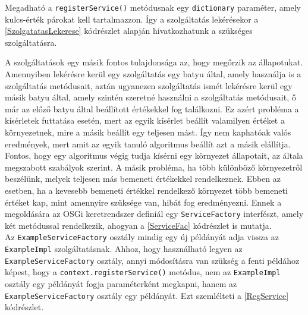 %


Megadható a \texttt{registerService()} metódusnak egy \texttt{dictionary} paraméter, amely kulcs-érték párokat kell tartalmazzon. Így a szolgáltatás lekérésekor a \ref{SzolgatatasLekerese} kódrészlet alapján hivatkozhatunk a szükséges szolgáltatásra.

%



A szolgáltatások egy másik fontos tulajdonsága az, hogy megőrzik az állapotukat. Amennyiben lekérésre kerül egy szolgáltatás egy batyu által, amely használja is a szolgáltatás metódusait, aztán ugyanezen szolgáltatás ismét lekérésre kerül egy másik batyu által, amely szintén szeretné használni a szolgáltatás metódusait, ő már az előző batyu által beállított értékekkel fog találkozni. Ez azért probléma a kísérletek futtatása esetén, mert az egyik kísérlet beállít valamilyen értéket a környezetnek, mire a másik beállít egy teljesen mást. Így nem kaphatóak valós eredmények, mert amit az egyik tanuló algoritmus beállít azt a másik elállítja. Fontos, hogy egy algoritmus végig tudja kísérni egy környezet állapotait, az általa megszabott szabályok szerint. A másik probléma, ha több különböző környezetről beszélünk, melyek teljesen más bemeneti értékekkel rendelkeznek. Ebben az esetben, ha a kevesebb bemeneti értékkel rendelkező környezet több bemeneti értéket kap, mint amennyire szüksége van, hibát fog eredményezni. Ennek a megoldására az OSGi keretrendszer definiál egy \texttt{ServiceFactory} interfészt, amely két metódussal rendelkezik, ahogyan a \ref{ServiceFac} kódrészlet is mutatja.
\\
%


Az \texttt{ExampleServiceFactory} osztály mindig egy új példányát adja vissza az \texttt{ExampleImpl} szolgáltatásnak. Ahhoz, hogy használható legyen az \texttt{ExampleServiceFactory} osztály, annyi módosításra van szükség a fenti példához képest, hogy a \texttt{context.registerService()} metódus, nem az \texttt{ExampleImpl} osztály egy példányát fogja paraméterként megkapni, hanem az \texttt{ExampleServiceFactory} osztály egy példányát. Ezt szemlélteti a \ref{RegService} kódrészlet.

